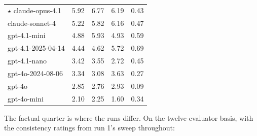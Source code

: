 \documentclass{article}
\begin{document}
\begin{table}[H]
\begin{center}
\begin{tabular}{@{}lrrrr@{}}
\ensuremath{\star} claude-opus-4.1 &\cellcolor[HTML]{279BC1}\textcolor[HTML]{FFFFFF}{5.92}&\cellcolor[HTML]{1F7CB6}\textcolor[HTML]{FFFFFF}{6.77}&\cellcolor[HTML]{1F93C0}\textcolor[HTML]{FFFFFF}{6.19}&\cellcolor[HTML]{64C3BF}\textcolor[HTML]{000000}{0.43} \\
claude-sonnet-4 &\cellcolor[HTML]{3BAFC3}\textcolor[HTML]{000000}{5.22}&\cellcolor[HTML]{299EC1}\textcolor[HTML]{FFFFFF}{5.82}&\cellcolor[HTML]{2094C0}\textcolor[HTML]{FFFFFF}{6.16}&\cellcolor[HTML]{50BCC2}\textcolor[HTML]{000000}{0.47} \\
gpt-4.1-mini &\cellcolor[HTML]{47B8C3}\textcolor[HTML]{000000}{4.88}&\cellcolor[HTML]{269AC1}\textcolor[HTML]{FFFFFF}{5.93}&\cellcolor[HTML]{44B7C3}\textcolor[HTML]{000000}{4.93}&\cellcolor[HTML]{279BC1}\textcolor[HTML]{FFFFFF}{0.59} \\
gpt-4.1-2025-04-14 &\cellcolor[HTML]{5DC0C0}\textcolor[HTML]{000000}{4.44}&\cellcolor[HTML]{54BDC1}\textcolor[HTML]{000000}{4.62}&\cellcolor[HTML]{2CA1C2}\textcolor[HTML]{FFFFFF}{5.72}&\cellcolor[HTML]{2076B4}\textcolor[HTML]{FFFFFF}{0.69} \\
gpt-4.1-nano &\cellcolor[HTML]{92D4B9}\textcolor[HTML]{000000}{3.42}&\cellcolor[HTML]{8BD1BA}\textcolor[HTML]{000000}{3.55}&\cellcolor[HTML]{BAE4B5}\textcolor[HTML]{000000}{2.72}&\cellcolor[HTML]{5ABFC0}\textcolor[HTML]{000000}{0.45} \\
gpt-4o-2024-08-06 &\cellcolor[HTML]{97D6B9}\textcolor[HTML]{000000}{3.34}&\cellcolor[HTML]{A6DCB7}\textcolor[HTML]{000000}{3.08}&\cellcolor[HTML]{86D0BA}\textcolor[HTML]{000000}{3.63}&\cellcolor[HTML]{BBE5B5}\textcolor[HTML]{000000}{0.27} \\
gpt-4o &\cellcolor[HTML]{B3E1B6}\textcolor[HTML]{000000}{2.85}&\cellcolor[HTML]{B8E3B5}\textcolor[HTML]{000000}{2.76}&\cellcolor[HTML]{AEDFB6}\textcolor[HTML]{000000}{2.93}&\cellcolor[HTML]{F2FABC}\textcolor[HTML]{000000}{0.09} \\
gpt-4o-mini &\cellcolor[HTML]{D3EEB3}\textcolor[HTML]{000000}{2.10}&\cellcolor[HTML]{CFECB3}\textcolor[HTML]{000000}{2.25}&\cellcolor[HTML]{E2F4B2}\textcolor[HTML]{000000}{1.60}&\cellcolor[HTML]{93D5B9}\textcolor[HTML]{000000}{0.34} \\
\bottomrule
\end{tabular}
\end{center}
\end{table}

The factual quarter is where the runs differ. On the twelve-evaluator basis, with the consistency ratings from run 1's sweep throughout:
\end{document}
